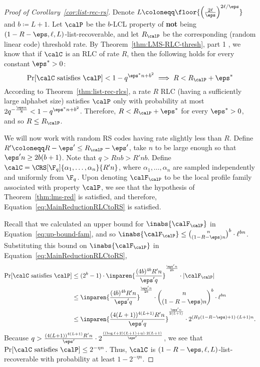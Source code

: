 \documentclass{article}
\begin{document}
\begin{proof}[Proof of Corollary~\ref{cor:list-rec-rs}]
    Denote $L \coloneqq \floor{\left(\frac{2\ell}{\eps}\right)^{2\ell/\eps}}$ and $b \coloneqq L+1$. Let $\calP$ be the $b$-LCL property of \textbf{not} being $(1-R-\eps, \ell, L)$-list-recoverable, and let $R_{\calP}$ be the corresponding (random linear code) threshold rate.
    By Theorem~\ref{thm:LMS-RLC-thresh}, part 1 \cite{levi2024random}, we know that if $\calC$ is an RLC of rate $R$, then the following holds for every constant $\eps^*>0$:
    \[
        \Pr [\calC \textrm{ satisfies }\calP] < 1-q^{\eps^*n + b^2} \implies R < R_\calP+ \eps^*
    \]
    According to Theorem~\ref{thm:list-rec-rlcs}, a rate $R$ RLC (having a sufficiently large alphabet size) satisfies $\calP$ only with probability at most $2q^{-\frac{\eps n}{8}} < 1-q^{\eps^*n + b^2}$.
    Therefore, $R < R_\calP+ \eps^*$ for every $\eps^*>0$, and so $R \le R_\calP$.

    We will now work with random RS codes having rate slightly less than $R$.
    Define $R' \coloneqq R-\eps' \le R_\calP-\eps'$, take $n$ to be large enough so that $\eps' n \ge 2b(b+1)$.
    Note that $q > Rnb > R'nb$.
    Define $\calC = \CRS[\F_q]{\alpha_1,\dots,\alpha_n}{R'n}$, where $\alpha_1,\dots,\alpha_n$ are sampled independently and uniformly from $\F_q$.
    Upon denoting $\calF_\calP$ to be the local profile family associated with property $\calP$, we see that the hypothesis of Theorem~\ref{thm:lms-red} \cite{levi2024random} is satisfied, and therefore, Equation~\ref{eq:MainReductionRLCtoRS} is satisfied.

    Recall that we calculated an upper bound for $\inabs{\calF_\calP}$ in Equation~\ref{eq:up-bound-fam}, and so $\inabs{\calF_\calP} \le \binom{n}{(1-R-\eps)n}^{b}\cdot \ell^{bn}$.
    Substituting this bound on $\inabs{\calF_\calP}$ in Equation~\ref{eq:MainReductionRLCtoRS},
    \begin{align*}
        \Pr [\calC \textrm{ satisfies }\calP] &\le (2^b-1) \cdot \inparen{\frac {(4b)^{4b}R'n}  {\eps' q}}^{\frac{\eps' n}{2b}} \cdot |\calF_\calP| \\
        &\le \inparen{\frac {(4b)^{4b}R'n}  {\eps' q}}^{\frac{\eps' n}{2b}} \cdot \binom{n}{(1-R-\eps)n}^{b}\cdot \ell^{bn} \\
        &\le \inparen{\frac {(4(L+1))^{4(L+1)}R'n}  {\eps' q}}^{\frac{\eps' n}{2(L+1)}} \cdot 2^{(H_2(1-R-\eps)+1)\cdot (L+1) n}.
    \end{align*}
    Because $q > \frac{(4(L+1))^{4(L+1)}R'n}{\eps'}\cdot 2^{\frac{((\log \ell + 2)(L+1)+ \eta)\cdot 2(L+1)}{\eps'}}$, we see that $\Pr [\calC \textrm{ satisfies }\calP] \le 2^{-\eta n}$.
    Thus, $\calC$ is $(1-R-\eps, \ell, L)$-list-recoverable with probability at least $1-2^{-\eta n}$.
\end{proof}
\end{document}
